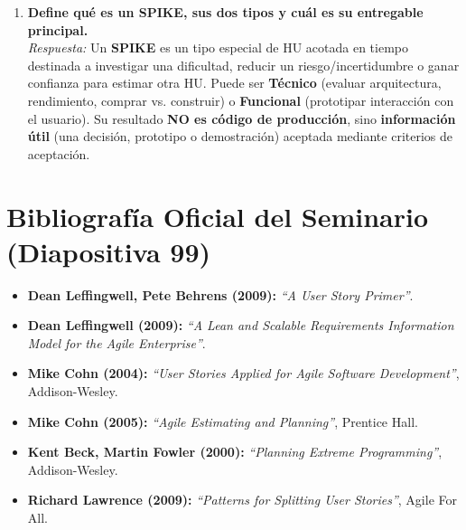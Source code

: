 \begin{enumerate}[label=\textbf{P\arabic*.}, itemsep=6pt]
    \item \textbf{Define qué es un SPIKE, sus dos tipos y cuál es su entregable principal.}\\
    \textit{Respuesta:} Un \textbf{SPIKE} es un tipo especial de HU acotada en tiempo destinada a investigar una dificultad, reducir un riesgo/incertidumbre o ganar confianza para estimar otra HU. Puede ser \textbf{Técnico} (evaluar arquitectura, rendimiento, comprar vs. construir) o \textbf{Funcional} (prototipar interacción con el usuario). Su resultado \textbf{NO es código de producción}, sino \textbf{información útil} (una decisión, prototipo o demostración) aceptada mediante criterios de aceptación.
\end{enumerate}

\section{Bibliografía Oficial del Seminario (Diapositiva 99)}
\begin{itemize}[itemsep=3pt]
    \item \textbf{Dean Leffingwell, Pete Behrens (2009):} \textit{``A User Story Primer''}.
    \item \textbf{Dean Leffingwell (2009):} \textit{``A Lean and Scalable Requirements Information Model for the Agile Enterprise''}.
    \item \textbf{Mike Cohn (2004):} \textit{``User Stories Applied for Agile Software Development''}, Addison-Wesley.
    \item \textbf{Mike Cohn (2005):} \textit{``Agile Estimating and Planning''}, Prentice Hall.
    \item \textbf{Kent Beck, Martin Fowler (2000):} \textit{``Planning Extreme Programming''}, Addison-Wesley.
    \item \textbf{Richard Lawrence (2009):} \textit{``Patterns for Splitting User Stories''}, Agile For All.
\end{itemize}
